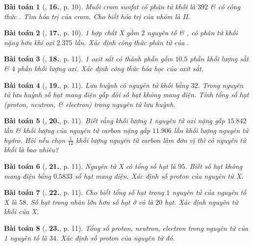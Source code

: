 \documentclass{article}
\numberwithin{equation}{section}
\newtheorem{baitoan}{Bài toán}[section]
\begin{document}
\begin{baitoan}[\cite{An2011}, \textbf{16.}, p. 10]
	Muối crom sunfat có phân tử khối là $392$ \& có công thức . Tìm hóa trị của crom. Cho biết hóa trị của nhóm  là II.
\end{baitoan}

\begin{baitoan}[\cite{An2011}, \textbf{17.}, p. 10]
	1 hợp chất X gồm $2$ nguyên tố  \& , có phân tử khối nặng hơn khí oxi $2.375$ lần. Xác định công thức phân tử của .
\end{baitoan}

\begin{baitoan}[\cite{An2011}, \textbf{18.}, p. 11]
	1 oxit sắt có thành phần gồm $10.5$ phần khối lượng sắt \& $4$ phần khối lượng oxi. Xác định công thức hóa học của oxit sắt.
\end{baitoan}

\begin{baitoan}[\cite{An2011}, \textbf{19.}, p. 11]
	Lưu huỳnh có nguyên tử khối bằng $32$. Trong nguyên tử lưu huỳnh số hạt mang điện gấp đôi số hạt không mang điện. Tính tổng số hạt (proton, neutron, \& electron) trong nguyên tử lưu huỳnh.
\end{baitoan}

\begin{baitoan}[\cite{An2011}, \textbf{20.}, p. 11]
	Biết rằng khối lượng 1 nguyên tử oxi nặng gấp $15.842$ lần \& khối lượng của nguyên tử carbon nặng gấp $11.906$ lần khối lượng nguyên tử hydro. Hỏi nếu chọn $\frac{1}{12}$ khối lượng nguyên tử carbon làm đơn vị thì  có nguyên tử khối là bao nhiêu?
\end{baitoan}

\begin{baitoan}[\cite{An2011}, \textbf{21.}, p. 11]
	Nguyên tử X có tổng số hạt là $95$. Biết số hạt không mang điện bằng $0.5833$ số hạt mang điện. Xác định số proton của nguyên tử X.
\end{baitoan}

\begin{baitoan}[\cite{An2011}, \textbf{22.}, p. 11]
	Cho biết tổng số hạt trong $1$ nguyên tử của nguyên tố X là $58$. Số hạt trong nhân lớn hơn số hạt ở vỏ là $20$ hạt. Xác định nguyên tử khối của X.
\end{baitoan}

\begin{baitoan}[\cite{An2011}, \textbf{23.}, p. 11]
	Tổng số proton, neutron, electron trong nguyên tử của 1 nguyên tố là $34$. Xác định số proton của nguyên tử đó.
\end{baitoan}
\end{document}

